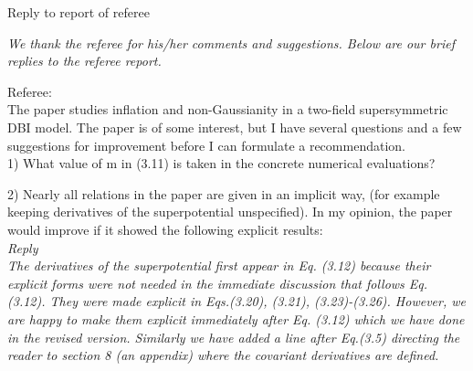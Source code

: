\documentclass[a4paper,11pt]{article}
\begin{document}
 \begin{center}
 Reply to report of referee
  \end{center}

{\it We thank the referee for his/her comments and suggestions. 
Below are our brief replies to the referee report.}


\noindent
Referee:\\
 The paper studies inflation and non-Gaussianity in a two-field supersymmetric DBI model. The paper is of some interest, but I have several questions and a few suggestions for improvement before I can formulate a recommendation.\\
 
1) What value of m in (3.11) is taken in the concrete numerical evaluations?\\
 
2) Nearly all relations in the paper are given in an implicit way, (for example keeping derivatives of the superpotential unspecified). In my opinion, the paper would improve if it showed the following explicit results:\\
 
 {\it Reply\\
 The derivatives of the superpotential first appear in Eq. (3.12) because their explicit forms were not needed in the
 immediate discussion that follows Eq. (3.12). They were made explicit in Eqs.(3.20), (3.21), (3.23)-(3.26). 
 However, we are happy to make them explicit immediately after Eq. (3.12) which we have done in the revised version.
 Similarly we have added a line after Eq.(3.5) directing the reader to section 8 (an appendix) where the covariant derivatives
 are defined.
 }
 
\end{document}
